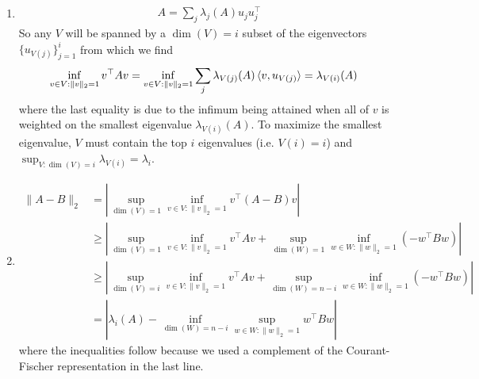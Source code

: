 \documentclass[12pt,letterpaper,boxed]{hmcpset}
\begin{document}
\begin{solution}
  \begin{enumerate}
    \item
      \begin{align}
	A = \sum_j \lambda_j(A) u_j u_j^\top
      \end{align}
      So any $V$ will be spanned by a $\dim(V) = i$ subset
      of the eigenvectors $\{u_{V(j)}\}_{j=1}^i$ from which we find
      \begin{align}
	\inf_{v \in V: \|v\|_2 = 1} v^\top A v
	&= \inf_{v \in V: \|v\|_2 = 1} \sum_j \lambda_{V(j)}(A) \braket{v, u_{V(j)}}
	= \lambda_{V(i)}(A)
      \end{align}
      where the last equality is due to the infimum being attained when
      all of $v$ is weighted on the smallest eigenvalue $\lambda_{V(i)}(A)$.
      To maximize the smallest eigenvalue, $V$ must contain the top $i$
      eigenvalues (i.e. $V(i) = i$) and $\sup_{V : \dim(V) = i} \lambda_{V(i)} = \lambda_i$.
    \item
      \begin{align}
      	\|A - B \|_2
	&= \left\lvert
	  \sup_{\dim(V) = 1} \inf_{v \in V : \|v\|_2 = 1} v^\top (A - B) v
	\right\rvert \\
	&\geq \left\lvert
	  \sup_{\dim(V) = 1} \inf_{v \in V : \|v\|_2 = 1} v^\top A v
	  + \sup_{\dim(W) = 1} \inf_{w \in W : \|w\|_2 = 1} (- w^\top B w)
	\right\rvert \\
	&\geq \left\lvert
	  \sup_{\dim(V) = i} \inf_{v \in V : \|v\|_2 = 1} v^\top A v
	  + \sup_{\dim(W) = n-i} \inf_{w \in W : \|w\|_2 = 1} (- w^\top B w)
	\right\rvert \\
	&= \left\lvert
	  \lambda_i(A)
	  - \inf_{\dim(W) = n-i} \sup_{w \in W : \|w\|_2 = 1} w^\top B w
	\right\rvert
      \end{align}
      where the inequalities follow because
      we used a complement of the Courant-Fischer representation
      in the last line.
  \end{enumerate}
\end{solution}

\begin{problem}
\end{problem}
\end{document}
